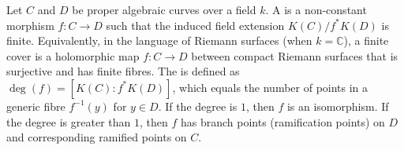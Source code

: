 \begin{definition} \label{definition:finite_cover_of_curves}
Let $C$ and $D$ be proper algebraic curves over a field $k$. A  is a non-constant morphism $f : C \to D$ such that the induced field extension $K(C)/f^*K(D)$ is finite.
Equivalently, in the language of Riemann surfaces (when $k = \mathbb{C}$), a finite cover is a holomorphic map $f : C \to D$ between compact Riemann surfaces that is surjective and has finite fibres.
The  is defined as $\deg(f) = [K(C) : f^*K(D)]$, which equals the number of points in a generic fibre $f^{-1}(y)$ for $y \in D$.
If the degree is $1$, then $f$ is an isomorphism. If the degree is greater than $1$, then $f$ has branch points (ramification points) on $D$ and corresponding ramified points on $C$.
\end{definition}
